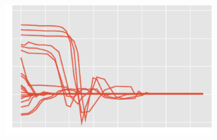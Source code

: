 \begin{figure}[htb]
{\begin{subfigure}[t]{0.5\textwidth+0.4in}
    \end{subfigure}%
    \begin{subfigure}[t]{0.5\textwidth+0.4in}%
		\includegraphics{img/ballistic_bf_uy}%
    \end{subfigure}}\\%
\end{figure}
